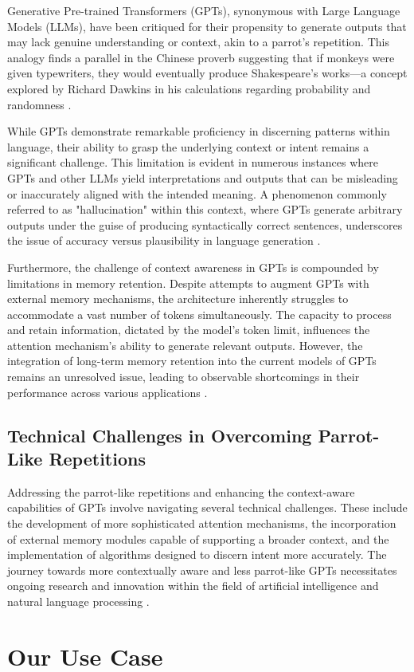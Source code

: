 \documentclass{article}
\begin{document}
Generative Pre-trained Transformers (GPTs), synonymous with Large Language Models (LLMs), have been critiqued for their propensity to generate outputs that may lack genuine understanding or context, akin to a parrot's repetition. This analogy finds a parallel in the Chinese proverb suggesting that if monkeys were given typewriters, they would eventually produce Shakespeare's works—a concept explored by Richard Dawkins in his calculations regarding probability and randomness \citep{dawkins_monkeys}.

While GPTs demonstrate remarkable proficiency in discerning patterns within language, their ability to grasp the underlying context or intent remains a significant challenge. This limitation is evident in numerous instances where GPTs and other LLMs yield interpretations and outputs that can be misleading or inaccurately aligned with the intended meaning. A phenomenon commonly referred to as "hallucination" within this context, where GPTs generate arbitrary outputs under the guise of producing syntactically correct sentences, underscores the issue of accuracy versus plausibility in language generation \citep{gpt_hallucination}.

Furthermore, the challenge of context awareness in GPTs is compounded by limitations in memory retention. Despite attempts to augment GPTs with external memory mechanisms, the architecture inherently struggles to accommodate a vast number of tokens simultaneously. The capacity to process and retain information, dictated by the model's token limit, influences the attention mechanism's ability to generate relevant outputs. However, the integration of long-term memory retention into the current models of GPTs remains an unresolved issue, leading to observable shortcomings in their performance across various applications \citep{gpt_memory_limitations}.

\subsection{Technical Challenges in Overcoming Parrot-Like Repetitions}

Addressing the parrot-like repetitions and enhancing the context-aware capabilities of GPTs involve navigating several technical challenges. These include the development of more sophisticated attention mechanisms, the incorporation of external memory modules capable of supporting a broader context, and the implementation of algorithms designed to discern intent more accurately. The journey towards more contextually aware and less parrot-like GPTs necessitates ongoing research and innovation within the field of artificial intelligence and natural language processing \citep{ai_innovation_challenges}.



\section{Our Use Case}





\end{document}
